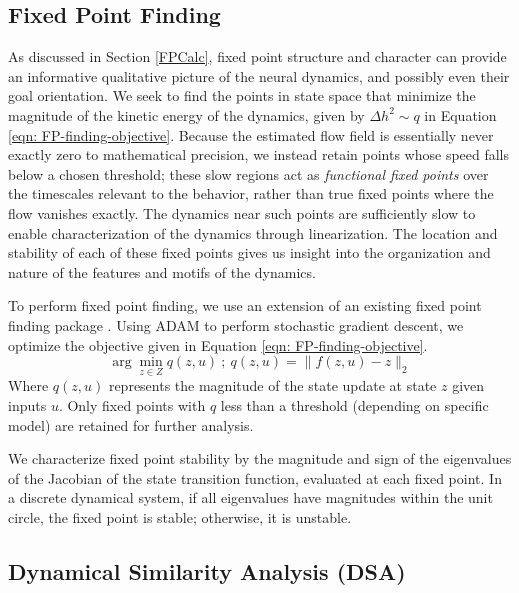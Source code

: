 \documentclass{article}
\begin{document}
\subsection{Fixed Point Finding \label{appendix:ComparisonMethods-FP_Finding}}
As discussed in Section \ref{FPCalc}, fixed point structure and character can provide an informative qualitative picture of the neural dynamics, and possibly even their goal orientation. We seek to find the points in state space that minimize the magnitude of the kinetic energy of the dynamics, given by $\Delta h^2 \sim q$ in Equation \ref{eqn: FP-finding-objective}. Because the estimated flow field is essentially never exactly zero to mathematical precision, we instead retain points whose speed falls below a chosen threshold; these slow regions act as \textit{functional fixed points} over the timescales relevant to the behavior, rather than true fixed points where the flow vanishes exactly. The dynamics near such points are sufficiently slow to enable characterization of the dynamics through linearization. The location and stability of each of these fixed points gives us insight into the organization and nature of the features and motifs of the dynamics.

To perform fixed point finding, we use an extension of an existing fixed point finding package \cite{golub_fixedpointfinder_2018}. Using ADAM to perform stochastic gradient descent, we optimize the objective given in Equation \ref{eqn: FP-finding-objective}.
\begin{equation}
\arg \min_{z \in Z} q(z, u) \ ; \ q(z, u) = \| f(z, u) - z \|_2 \label{eqn: FP-finding-objective}
\end{equation}
Where \( q(z, u) \) represents the magnitude of the state update at state \( z \) given inputs \( u \). Only fixed points with $q$ less than a threshold (depending on specific model) are retained for further analysis.

We characterize fixed point stability by the magnitude and sign of the eigenvalues of the Jacobian of the state transition function, evaluated at each fixed point. In a discrete dynamical system, if all eigenvalues have magnitudes within the unit circle, the fixed point is stable; otherwise, it is unstable.


\clearpage
\subsection{Dynamical Similarity Analysis (DSA) \label{appendix:ComparisonMethods-DSA}}
\end{document}
